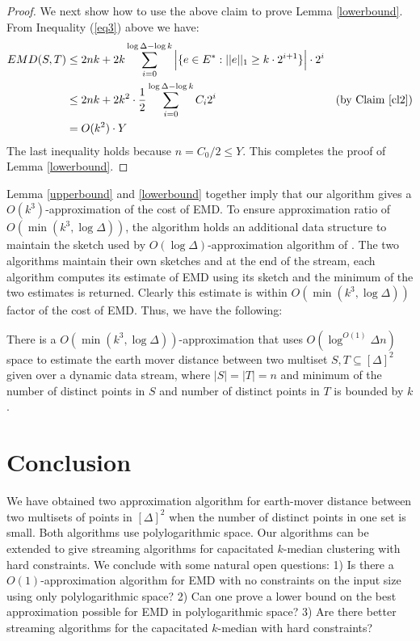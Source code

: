 \documentclass[oribibl]{llncs}
\begin{document}
\begin{proof}
We next show how to use the above claim to prove Lemma \ref{lowerbound}.
From Inequality (\ref{eq3}) above we have:
\begin{align}
 EMD(S,T) &\le 2nk + 2k\sum_{i=0}^{\log \Delta-\log k}\Big|\{e\in E^*: ||e||_1\ge k\cdot 2^{i+1}\}\Big|\cdot2^{i}\nonumber\\
          &\le 2nk + 2k^2\cdot\frac{1}{2}\sum_{i=0}^{\log \Delta-\log k}C_{i}2^i&\text{(by Claim \ref{cl2})}\nonumber\\
          &= O(k^2)\cdot Y \nonumber
\end{align}
The last inequality holds because $n= C_0/2 \le Y$.
This completes the proof of Lemma \ref{lowerbound}.
\end{proof}

Lemma \ref{upperbound} and \ref{lowerbound} together imply that our algorithm
gives a $O(k^3)$-approximation of the cost of EMD.
To ensure approximation ratio of $O(\min(k^3, \log\Delta))$, 
the algorithm holds an additional
data structure to maintain the sketch used by 
$O(\log\Delta)$-approximation algorithm of \cite{ind04}. 
The two algorithms
maintain their own sketches and at the end of the stream, each
algorithm computes its estimate of EMD using its sketch and the minimum
of the two estimates is returned. Clearly this estimate is within 
$O(\min(k^3, \log\Delta))$ factor of the cost of EMD.
Thus, we have the following:

\begin{theorem}
There is a $O(\min(k^3, \log\Delta))$-approximation that uses 
$O(\log^{O(1)}\Delta n)$ space to estimate the                                     
earth mover distance between two multiset $S,T\subseteq[\Delta]^2$ given over
a dynamic data stream, where $|S| = |T| = n$ and minimum of the number of
distinct points in $S$ and number of distinct points in $T$ is bounded by $k$. 
\end{theorem}

\section{Conclusion}\label{conclude}
We have obtained two approximation algorithm for earth-mover distance
between two multisets of points in $[\Delta]^2$ when the number of
distinct points in one set is small. Both algorithms use polylogarithmic space.
Our algorithms can be extended to give streaming algorithms for
capacitated $k$-median clustering with hard constraints.
We conclude with some natural open questions: 1) Is there a $O(1)$-approximation
algorithm for EMD with no constraints on the input size using only polylogarithmic space?
2) Can one prove a lower bound on the best approximation possible for EMD
in polylogarithmic space?
3) Are there better streaming algorithms for the capacitated $k$-median
with hard constraints? 


\end{document}
